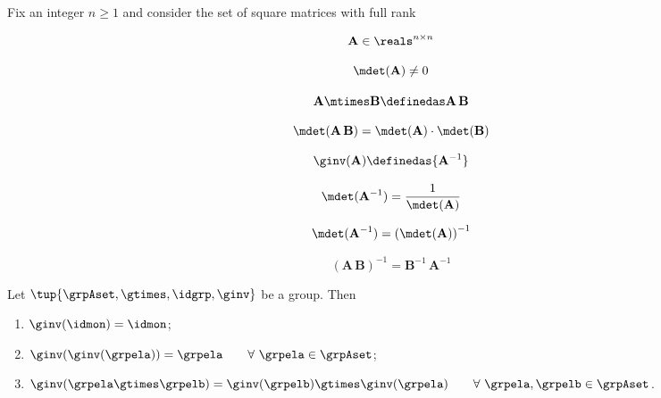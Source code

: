 \begin{example}\label{exa:square-full}

Fix an integer $n\geq1 $ and consider the set of square matrices with full rank


\begin{equation} \label{eq:group-fullrank-issquare}
    \mathbf{A} \in \reals^{n\times n}
\end{equation}

\begin{equation} \label{eq:group-fullrank-isfullrank}
   \mdet(\mathbf{A}) \neq 0
\end{equation}


\begin{equation} \label{eq:group-fullrank-composition}
   \mathbf{A} \mtimes \mathbf{B}  \definedas \mathbf{A}\,\mathbf{B}
\end{equation}


\begin{equation} \label{eq:group-fullrank-composition-det}
   \mdet(\mathbf{A} \, \mathbf{B}) = \mdet(\mathbf{A}) \cdot  \mdet(\mathbf{B})
\end{equation}

\begin{equation} \label{eq:group-fullrank-inverse}
   \ginv(\mathbf{A}) \definedas {\mathbf{A}^{-1}}
\end{equation}


\begin{equation} \label{eq:group-fullrank-inverse-det}
   \mdet(\mathbf{A}^{-1}) = \frac{1}{\mdet(\mathbf{A})}
\end{equation}

\begin{equation} \label{eq:group-fullrank-inverse-det2}
   \mdet(\mathbf{A}^{-1}) = \left( \mdet(\mathbf{A}) \right) ^ {-1}
\end{equation}

\begin{equation} \label{eq:group-fullrank-inverse-comp}
   (\mathbf{A}\,\mathbf{B})^{-1} = {\mathbf{B}^{-1} \, \mathbf{A}^{-1}}
\end{equation}









\end{example}

\begin{lemma}\label{lemma-inv-op-properties}
Let $\tup{\grpAset, \gtimes, \idgrp, \ginv}$ be a group. Then 
\begin{enumerate}
\item\label{eq:group-neutral-invariant} $\ginv(\idmon) = \idmon$;
\item\label{eq:group-inverse-inverse}  $ \ginv(\ginv(\grpela)) = \grpela \quad \quad \forall \  \grpela \in \grpAset$;
\item\label{eq:group-inverse-of-composition} $\ginv(\grpela \gtimes \grpelb ) = \ginv(\grpelb) \gtimes \ginv(\grpela) \quad \quad \forall \ \grpela, \grpelb \in \grpAset$.
\end{enumerate}
\end{lemma}

